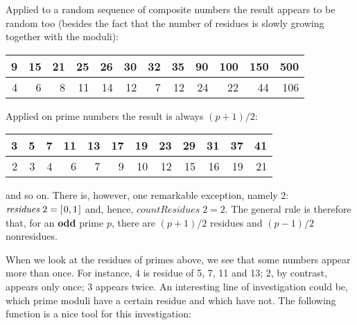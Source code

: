\documentclass{scrreprt}
\newcommand{\Varid}[1]{\mathit{#1}}
\begin{document}
Applied to a random sequence of composite numbers
the result appears to be random too
(besides the fact that the number of residues
is slowly growing together with the moduli):

\begin{tabular}{r|r|r|r|r|r|r|r|r|r|r|r}
 9 & 15 & 21 & 25 & 26 & 30 & 32 & 35 & 90 & 100 & 150 & 500\\\hline
 4 &  6 &  8 & 11 & 14 & 12 &  7 & 12 & 24 &  22 &  44 & 106
\end{tabular}

Applied on prime numbers the result is always
$(p+1)/2$:

\begin{tabular}{r|r|r|r|r|r|r|r|r|r|r|r}
 3 &  5 &  7 & 11 & 13 & 17 & 19 & 23 & 29 &  31 &  37 &  41\\\hline
 2 &  3 &  4 &  6 &  7 &  9 & 10 & 12 & 15 &  16 &  19 &  21
\end{tabular}

and so on. There is, however, one remarkable exception,
namely 2: \ensuremath{\Varid{residues}\;\mathrm{2}\mathrel{=}[\mskip1.5mu \mathrm{0},\mathrm{1}\mskip1.5mu]} and, hence, \ensuremath{\Varid{countResidues}\;\mathrm{2}\mathrel{=}\mathrm{2}}.
The general rule is therefore that, for an \textbf{odd} prime $p$,
there are $(p+1)/2$ residues and $(p-1)/2$ nonresidues.

When we look at the residues of primes above,
we see that some numbers appear more than once.
For instance, 4 is residue of 5, 7, 11 and 13;
2, by contrast, appears only once;
3 appears twice.
An interesting line of investigation could be,
which prime moduli have a certain residue
and which have not.
The following function is a nice tool for this investigation:
\end{document}
